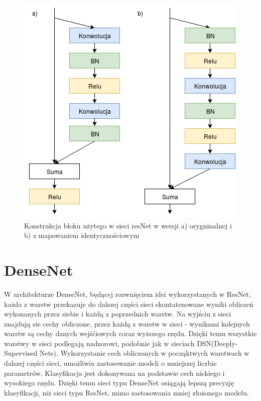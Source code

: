 \documentclass[a4paper,11pt,twoside]{report}
\theoremstyle{definition}
\begin{document}
\begin{figure}[h!]
	\centering
	\includegraphics{resnetBlock}
	\caption{Konstrukcja bloku użytego w sieci resNet w wersji a) orygninalnej i b) z mapowaniem identycznościowym}
\end{figure}

\section{DenseNet}

W architekturze DenseNet, będącej rozwnięciem idei wykorzystanych w ResNet, każda z warstw przekazuje do dalszej części sieci skontatenowane wyniki obliczeń wykonanych przez siebie i każdą z poprzednich warstw. Na wyjściu z sieci znajdują sie cechy obliczone, przez każdą z warstw w sieci - wynikami kolejnych warstw są cechy danych wejśćiowych coraz wyższego rzędu. Dzięki temu wszystkie warstwy w sieci podlegają nadzorowi, podobnie jak w sieciach DSN(Deeply-Supervised Nets)\cite{DSN}. Wykorzystanie cech obliczonych w począktwych warstwach w dalszej części sieci, umożliwia zastosowanie modeli o mniejszej liczbie parametrów. Klasyfikacja jest dokonywana na podstawie cech niskiego i wysokiego rzędu. Dzięki temu sieci typu DenseNet osiągają lepszą precyzję klasyfikacji, niż sieci typu ResNet, mimo zastosowania mniej złożonego modelu\cite{denseNet}. 
\end{document}
